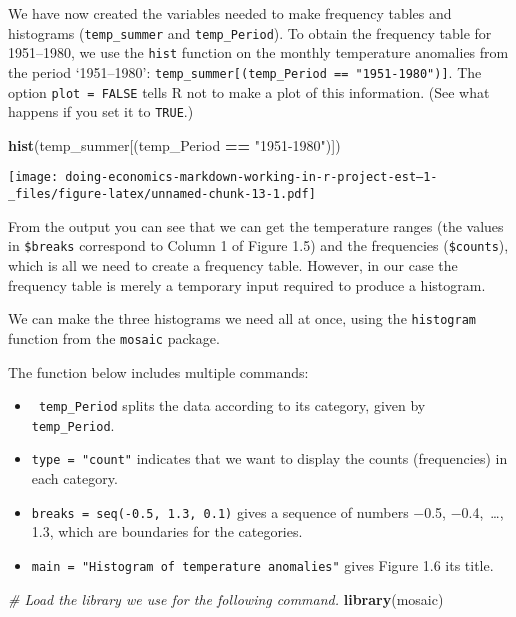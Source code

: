 \documentclass[
]{article}
\newenvironment{Shaded}{\begin{snugshade}}{\end{snugshade}}
\newcommand{\CommentTok}[1]{\textcolor[rgb]{0.56,0.35,0.01}{\textit{#1}}}
\newcommand{\FunctionTok}[1]{\textcolor[rgb]{0.13,0.29,0.53}{\textbf{#1}}}
\newcommand{\NormalTok}[1]{#1}
\newcommand{\SpecialCharTok}[1]{\textcolor[rgb]{0.81,0.36,0.00}{\textbf{#1}}}
\newcommand{\StringTok}[1]{\textcolor[rgb]{0.31,0.60,0.02}{#1}}
\providecommand{\tightlist}{%
  \setlength{\itemsep}{0pt}\setlength{\parskip}{0pt}}
\begin{document}
We have now created the variables needed to make frequency tables and
histograms (\texttt{temp\_summer} and \texttt{temp\_Period}). To obtain
the frequency table for 1951--1980, we use the \texttt{hist} function on
the monthly temperature anomalies from the period `1951--1980':
\texttt{temp\_summer{[}(temp\_Period\ ==\ "1951-1980"){]}}. The option
\texttt{plot\ =\ FALSE} tells R not to make a plot of this information.
(See what happens if you set it to \texttt{TRUE}.)

\begin{Shaded}
\begin{Highlighting}[]
\FunctionTok{hist}\NormalTok{(temp\_summer[(temp\_Period }\SpecialCharTok{==} \StringTok{"1951{-}1980"}\NormalTok{)])}
\end{Highlighting}
\end{Shaded}

\texttt{[image: doing-economics-markdown-working-in-r-project-est--1-\_files/figure-latex/unnamed-chunk-13-1.pdf]}

From the output you can see that we can get the temperature ranges (the
values in \texttt{\$breaks} correspond to Column 1 of Figure 1.5) and
the frequencies (\texttt{\$counts}), which is all we need to create a
frequency table. However, in our case the frequency table is merely a
temporary input required to produce a histogram.

We can make the three histograms we need all at once, using the
\texttt{histogram} function from the \texttt{mosaic} package.

The function below includes multiple commands:

\begin{itemize}
\tightlist
\item
  \texttt{\textbar{}\ temp\_Period} splits the data according to its
  category, given by \texttt{temp\_Period}.
\item
  \texttt{type\ =\ "count"} indicates that we want to display the counts
  (frequencies) in each category.
\item
  \texttt{breaks\ =\ seq(-0.5,\ 1.3,\ 0.1)} gives a sequence of numbers
  −0.5, −0.4,~\ldots, 1.3, which are boundaries for the categories.
\item
  \texttt{main\ =\ "Histogram\ of\ temperature\ anomalies"} gives Figure
  1.6 its title.
\end{itemize}

\begin{Shaded}
\begin{Highlighting}[]
\CommentTok{\# Load the library we use for the following command.}
\FunctionTok{library}\NormalTok{(mosaic)}
\end{Highlighting}
\end{Shaded}
\end{document}
